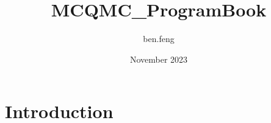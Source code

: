 \documentclass{article}
\title{MCQMC_ProgramBook}
\author{ben.feng }
\date{November 2023}
\begin{document}
\maketitle

\section{Introduction}
\end{document}

